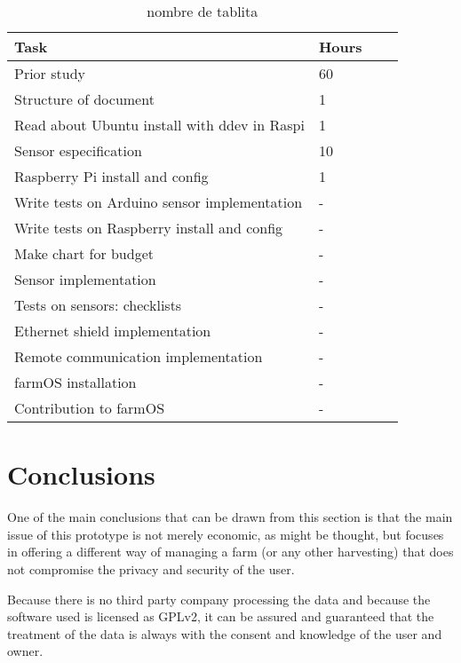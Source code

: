 \begin{table}[H]
\caption{nombre de tablita}
\begin{tabular}{llll}
\hline
                               \textbf{Task}   & \textbf{Hours} \\ \hline
\rowcolor{lightgray}                                           
Prior study                                     & 60           \\
Structure of document                           & 1 \\
\rowcolor{lightgray}                                           
Read about Ubuntu install with ddev in Raspi    & 1           \\
Sensor especification                           & 10           \\
\rowcolor{lightgray}                                           
Raspberry Pi install and config                 & 1           \\
Write tests on Arduino sensor implementation    & - \\
\rowcolor{lightgray}                                           
Write tests on Raspberry install and config     & - \\  
Make chart for budget                           & - \\
\rowcolor{lightgray}                                           
Sensor implementation                           & - \\
Tests on sensors: checklists                    & - \\
\rowcolor{lightgray}                                           
Ethernet shield implementation                  & - \\
Remote communication implementation             & - \\
\rowcolor{lightgray}                                           
farmOS installation                             & - \\
Contribution to farmOS                          & -
\end{tabular}
\end{table}

\section{Conclusions}
One of the main conclusions that can be drawn from this section is that the main issue of this prototype is not merely economic, as might be thought, but focuses in offering a different way of managing a farm (or any other harvesting) that does not compromise the privacy and security of the user.

Because there is no third party company processing the data and because the software used is licensed as GPLv2, it can be assured and guaranteed that the treatment of the data is always with the consent and knowledge of the user and owner.
